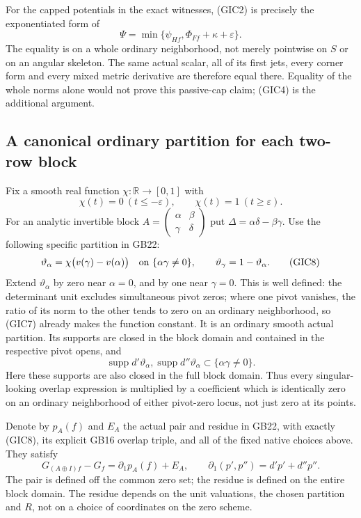 For the capped potentials in the exact witnesses, (GIC2) is
precisely the exponentiated form of
\[
        \Psi=\min\{\psi_{Hf},\Phi_{Ff}+\kappa+\varepsilon\}.
 \tag{GIC6}
\]
The equality is on a whole ordinary neighborhood, not merely
pointwise on $S$ or on an angular skeleton.  The same actual
scalar, all of its first jets, every corner form and every
mixed metric derivative are therefore equal there.  Equality
of the whole norms alone would not prove this passive-cap claim;
(GIC4) is the additional argument.

\subsection{A canonical ordinary partition for each two-row block}

Fix a smooth real function $\chi:\mathbb R\to[0,1]$ with
\[
          \chi(t)=0\ (t\le-\varepsilon),\qquad
          \chi(t)=1\ (t\ge\varepsilon).
 \tag{GIC7}
\]
For an analytic invertible block
$A=\left(\begin{smallmatrix}\alpha&\beta\\
\gamma&\delta\end{smallmatrix}\right)$ put
$\Delta=\alpha\delta-\beta\gamma$.  Use the following specific
partition in GB22:
\[
 \vartheta_\alpha=\chi\bigl(v(\gamma)-v(\alpha)\bigr)
       \quad\hbox{on }\{\alpha\gamma\ne0\},\qquad
 \vartheta_\gamma=1-\vartheta_\alpha.
 \tag{GIC8}
\]
Extend $\vartheta_\alpha$ by zero near $\alpha=0$, and by
one near $\gamma=0$.  This is well defined: the determinant
unit excludes simultaneous pivot zeros; where one pivot vanishes,
the ratio of its norm to the other tends to zero on an ordinary
neighborhood, so (GIC7) already makes the function constant.
It is an ordinary smooth actual partition.  Its supports are
closed in the block domain and contained in the respective
pivot opens, and
\[
       \operatorname{supp}d'\vartheta_\alpha,
       \operatorname{supp}d''\vartheta_\alpha
                              \subset\{\alpha\gamma\ne0\}.
 \tag{GIC9}
\]
Here these supports are also closed in the full block domain.
Thus every singular-looking overlap expression is multiplied by
a coefficient which is identically zero on an ordinary neighborhood
of either pivot-zero locus, not just zero at its points.

Denote by $p_A(f)$ and $E_A$ the actual pair and residue in
GB22, with exactly (GIC8), its explicit GB16 overlap triple,
and all of the fixed native choices above.  They satisfy
\[
     G_{(A\oplus I)f}-G_f=\partial_1p_A(f)+E_A,
                         \qquad \partial_1(p',p'')=d'p'+d''p''.
 \tag{GIC10}
\]
The pair is defined off the common zero set; the residue is
defined on the entire block domain.  The residue depends on
the unit valuations, the chosen partition and $R$, not on a
choice of coordinates on the zero scheme.

